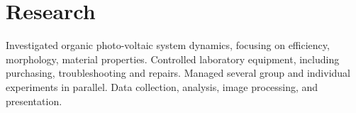 \documentclass[letterpaper]{deedy-resume} %
\begin{document}
\begin{minipage}[t]{0.66\textwidth}
\sectionspace %



\section{Research}


Investigated organic photo-voltaic system dynamics, focusing on efficiency, morphology, material properties. Controlled laboratory equipment, including purchasing, troubleshooting and repairs.  Managed several group and individual experiments in parallel. Data collection,
analysis, image processing, and presentation.



\end{minipage} %








\end{document}
